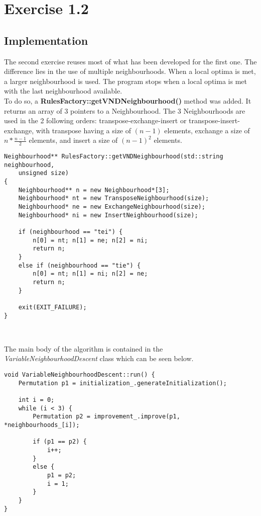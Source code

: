 \section{Exercise 1.2}

\subsection{Implementation}
The second exercise reuses most of what has been developed for the first one.
The difference lies in the use of multiple neighbourhoods. When a local optima
is met, a larger neighbourhood is used. The program stops when a local optima is
met with the last neighbourhood available.\\

To do so, a \textbf{RulesFactory::getVNDNeighbourhood()} method was added. It
returns an array of 3 pointers to a Neighbourhood. The 3 Neighbourhoods are used
in the 2 following orders: transpose-exchange-insert or transpose-insert-exchange,
with transpose having a size of $(n-1)$ elements, exchange a size of
$n * \frac{n-1}{2}$ elements, and insert a size of $(n-1)^2$ elements.\\

\begin{lstlisting}
Neighbourhood** RulesFactory::getVNDNeighbourhood(std::string neighbourhood,
    unsigned size)
{
    Neighbourhood** n = new Neighbourhood*[3];
    Neighbourhood* nt = new TransposeNeighbourhood(size);
    Neighbourhood* ne = new ExchangeNeighbourhood(size);
    Neighbourhood* ni = new InsertNeighbourhood(size);
    
    if (neighbourhood == "tei") {
        n[0] = nt; n[1] = ne; n[2] = ni;
        return n;
    }
    else if (neighbourhood == "tie") {
        n[0] = nt; n[1] = ni; n[2] = ne;
        return n;
    }
    
    exit(EXIT_FAILURE);
}
\end{lstlisting}
\

The main body of the algorithm is contained in the
\emph{VariableNeighbourhoodDescent} class which can be seen below.\\

\begin{lstlisting}
void VariableNeighbourhoodDescent::run() {
    Permutation p1 = initialization_.generateInitialization();
    
    int i = 0;
    while (i < 3) {
        Permutation p2 = improvement_.improve(p1, *neighbourhoods_[i]);
        
        if (p1 == p2) {
            i++;
        }
        else {
            p1 = p2;
            i = 1;
        }
    }
}
\end{lstlisting}


